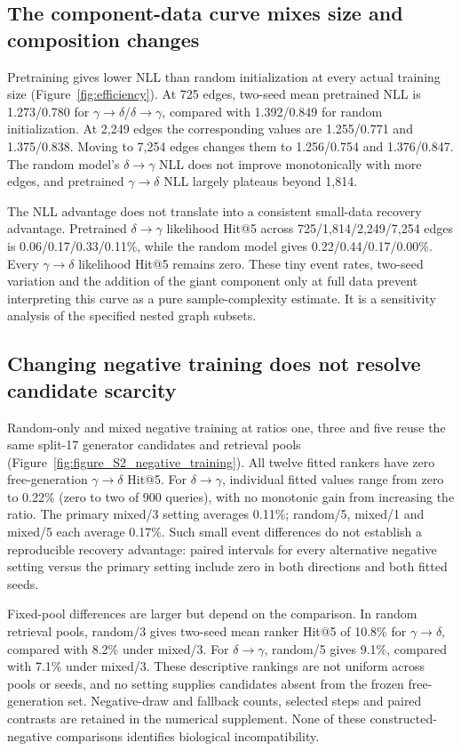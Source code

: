 \documentclass[10pt]{article}
\newcommand{\gtd}{\ensuremath{\gamma\!\rightarrow\!\delta}}
\newcommand{\dtg}{\ensuremath{\delta\!\rightarrow\!\gamma}}
\begin{document}
\subsection{The component-data curve mixes size and composition changes}
Pretraining gives lower NLL than random initialization at every actual training
size (Figure~\ref{fig:efficiency}). At 725 edges, two-seed mean pretrained NLL
is 1.273/0.780 for \gtd{}/\dtg{}, compared with 1.392/0.849 for random
initialization. At 2,249 edges the corresponding values are 1.255/0.771 and
1.375/0.838. Moving to 7,254 edges changes them to 1.256/0.754 and
1.376/0.847. The random model's \dtg{} NLL does not improve monotonically
with more edges, and pretrained \gtd{} NLL largely plateaus beyond 1,814.

The NLL advantage does not translate into a consistent small-data recovery
advantage. Pretrained \dtg{} likelihood Hit@5 across 725/1,814/2,249/7,254
edges is 0.06/0.17/0.33/0.11\%, while the random model gives
0.22/0.44/0.17/0.00\%. Every \gtd{} likelihood Hit@5 remains zero. These
tiny event rates, two-seed variation and the addition of the giant component
only at full data prevent interpreting this curve as a pure sample-complexity
estimate. It is a sensitivity analysis of the specified nested graph subsets.

\subsection{Changing negative training does not resolve candidate scarcity}
Random-only and mixed negative training at ratios one, three and five reuse the
same split-17 generator candidates and retrieval pools
(Figure~\ref{fig:figure_S2_negative_training}). All twelve fitted rankers have
zero free-generation \gtd{} Hit@5. For \dtg{}, individual fitted values range
from zero to 0.22\% (zero to two of 900 queries), with no monotonic gain from
increasing the ratio. The primary mixed/3 setting averages 0.11\%; random/5,
mixed/1 and mixed/5 each average 0.17\%. Such small event differences do not
establish a reproducible recovery advantage: paired intervals for every
alternative negative setting versus the primary setting include zero in both
directions and both fitted seeds.

Fixed-pool differences are larger but depend on the comparison. In random
retrieval pools, random/3 gives two-seed mean ranker Hit@5 of 10.8\% for
\gtd{}, compared with 8.2\% under mixed/3. For \dtg{}, random/5 gives
9.1\%, compared with 7.1\% under mixed/3. These descriptive rankings are not
uniform across pools or seeds, and no setting supplies candidates absent from
the frozen free-generation set. Negative-draw and fallback counts, selected
steps and paired contrasts are retained in the numerical supplement. None of
these constructed-negative comparisons identifies biological incompatibility.
\end{document}
